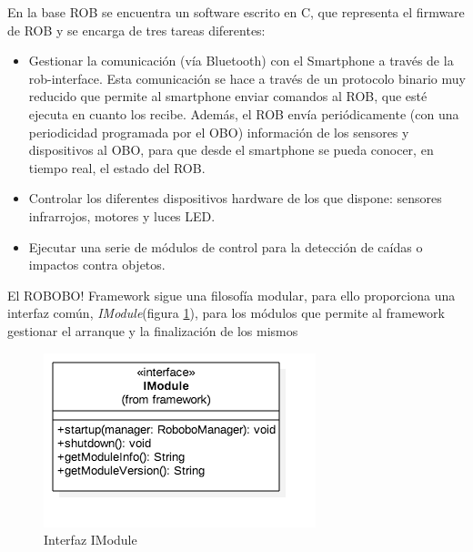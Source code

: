 En la base ROB se encuentra un software escrito en C, que representa el firmware de ROB y se encarga de tres tareas diferentes:
\begin{itemize}
	\item Gestionar la comunicación (vía Bluetooth) con el Smartphone a través de la rob-interface. Esta comunicación se hace a través de un protocolo binario muy reducido que permite al smartphone enviar comandos al ROB, que esté ejecuta en cuanto los recibe. Además, el ROB envía periódicamente (con una periodicidad programada por el OBO) información de los sensores y dispositivos al OBO, para que desde el smartphone se pueda conocer, en tiempo real, el estado del ROB. 
	\item Controlar los diferentes dispositivos hardware de los que dispone: sensores infrarrojos, motores y luces LED. 
	\item Ejecutar una serie de módulos de control para la detección de caídas o impactos contra objetos.

\end{itemize}



El ROBOBO! Framework sigue una filosofía modular, para ello proporciona una interfaz común, \textit{IModule}(figura \ref{fig:imodule}), para los módulos que permite al framework gestionar el arranque y la finalización de los mismos


\begin{figure}
	\centering
	\includegraphics[width=0.7\linewidth]{imagenes/diagramas/IModule.png}
	\caption{Interfaz IModule}
	\label{fig:imodule}
\end{figure}
